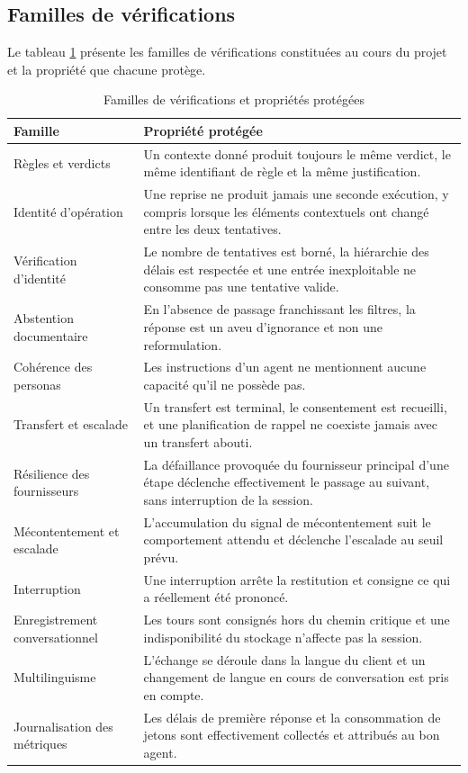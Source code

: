 \subsection{Familles de vérifications}

Le tableau \ref{tab:tests} présente les familles de vérifications constituées au cours du projet et la propriété que chacune protège.

\begin{table}[H]
\centering
\renewcommand{\arraystretch}{1.2}
\begin{tabular}{|p{4.4cm}|p{10.1cm}|}
\hline
\textbf{Famille} & \textbf{Propriété protégée} \\
\hline
Règles et verdicts & Un contexte donné produit toujours le même verdict, le même identifiant de règle et la même justification. \\
\hline
Identité d'opération & Une reprise ne produit jamais une seconde exécution, y compris lorsque les éléments contextuels ont changé entre les deux tentatives. \\
\hline
Vérification d'identité & Le nombre de tentatives est borné, la hiérarchie des délais est respectée et une entrée inexploitable ne consomme pas une tentative valide. \\
\hline
Abstention documentaire & En l'absence de passage franchissant les filtres, la réponse est un aveu d'ignorance et non une reformulation. \\
\hline
Cohérence des personas & Les instructions d'un agent ne mentionnent aucune capacité qu'il ne possède pas. \\
\hline
Transfert et escalade & Un transfert est terminal, le consentement est recueilli, et une planification de rappel ne coexiste jamais avec un transfert abouti. \\
\hline
Résilience des fournisseurs & La défaillance provoquée du fournisseur principal d'une étape déclenche effectivement le passage au suivant, sans interruption de la session. \\
\hline
Mécontentement et escalade & L'accumulation du signal de mécontentement suit le comportement attendu et déclenche l'escalade au seuil prévu. \\
\hline
Interruption & Une interruption arrête la restitution et consigne ce qui a réellement été prononcé. \\
\hline
Enregistrement conversationnel & Les tours sont consignés hors du chemin critique et une indisponibilité du stockage n'affecte pas la session. \\
\hline
Multilinguisme & L'échange se déroule dans la langue du client et un changement de langue en cours de conversation est pris en compte. \\
\hline
Journalisation des métriques & Les délais de première réponse et la consommation de jetons sont effectivement collectés et attribués au bon agent. \\
\hline
\end{tabular}
\caption{Familles de vérifications et propriétés protégées}
\label{tab:tests}
\end{table}

